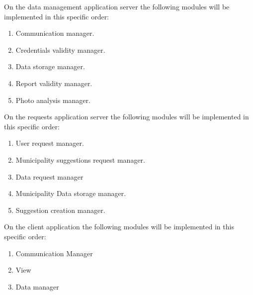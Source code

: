 \documentclass[titlepage]{article}
\begin{document}
On the data management application server the following modules will be implemented in this specific order:

\begin{enumerate}
	\item Communication manager.
	\item Credentials validity manager.
	\item Data storage manager.
	\item Report validity manager.
	\item Photo analysis manager.\\
\end{enumerate}


On the requests application server the following modules will be implemented in this specific order:

\begin{enumerate}
	\item User request manager.
	\item Municipality suggestions request manager.
	\item Data request manager
	\item Municipality Data storage manager.
	\item Suggestion creation manager.\\
\end{enumerate}

On the client application the following modules will be implemented in this specific order:
\begin{enumerate}
	\item Communication Manager
	\item View
	\item Data manager
\end{enumerate}
\end{document}
